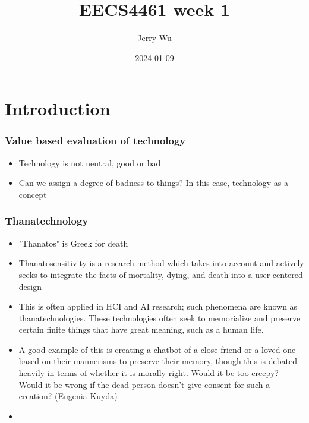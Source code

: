\documentclass[12pt]{book}
\title{EECS4461 week 1}
\author{Jerry Wu}
\date{2024-01-09}
\begin{document}
\maketitle
\tableofcontents



\chapter{Introduction}

\subsection*{Value based evaluation of technology}
\begin{itemize}
    \item Technology is not neutral, good or bad
    \item Can we assign a degree of badness to things? In this case, technology as a concept
\end{itemize}

\subsection*{Thanatechnology}
\begin{itemize}
    \item "Thanatos" is Greek for death
    \item Thanatosensitivity is a research method which takes into account and actively seeks to integrate the facts of mortality, dying, and death into a user centered design
    \item This is often applied in HCI and AI research; such phenomena are known as thanatechnologies. These technologies often seek to memorialize and preserve certain finite things that have great meaning, such as a human life.
    \item A good example of this is creating a chatbot of a close friend or a loved one based on their mannerisms to preserve their memory, though this is debated heavily in terms of whether it is morally right. Would it be too creepy? Would it be wrong if the dead person doesn't give consent for such a creation? (Eugenia Kuyda)
    \item 
\end{itemize}
\end{document}
